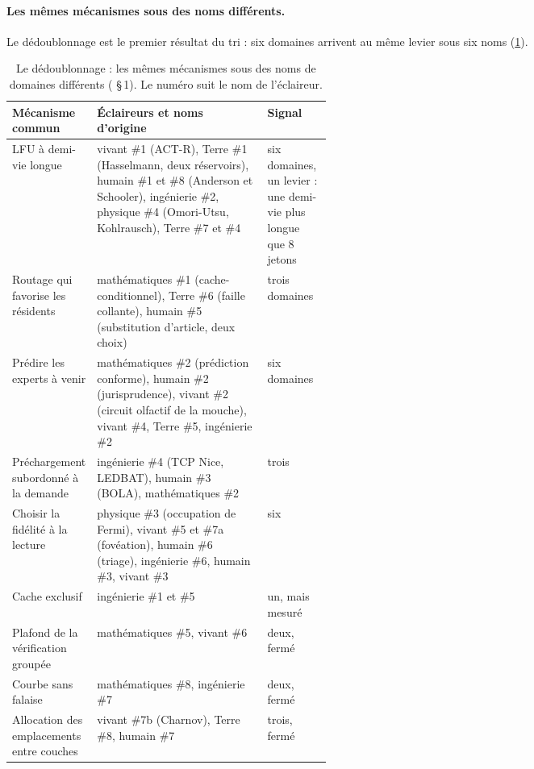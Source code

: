 \paragraph{Les mêmes mécanismes sous des noms différents.} Le dédoublonnage est le premier résultat du tri : six domaines arrivent au même levier sous six noms (\cref{t3mim:tab:doublons}).

\begin{table}[tbp]
\centering\small
\caption[Le dédoublonnage des candidats]{Le dédoublonnage : les mêmes mécanismes sous des noms de domaines différents ( §\,1). Le numéro suit le nom de l'éclaireur.}
\label{t3mim:tab:doublons}
\renewcommand{\arraystretch}{1.12}
\begin{tabularx}{\linewidth}{@{}>{\raggedright\arraybackslash}p{0.26\linewidth}>{\raggedright\arraybackslash}X>{\raggedright\arraybackslash}p{0.2\linewidth}@{}}
\toprule
Mécanisme commun & Éclaireurs et noms d'origine & Signal \\
\midrule
LFU à demi-vie longue & vivant \#1 (ACT-R), Terre \#1 (Hasselmann, deux réservoirs), humain \#1 et \#8 (Anderson et Schooler), ingénierie \#2, physique \#4 (Omori-Utsu, Kohlrausch), Terre \#7 et \#4 & six domaines, un levier : une demi-vie plus longue que 8 jetons \\
Routage qui favorise les résidents & mathématiques \#1 (cache-conditionnel), Terre \#6 (faille collante), humain \#5 (substitution d'article, deux choix) & trois domaines \\
Prédire les experts à venir & mathématiques \#2 (prédiction conforme), humain \#2 (jurisprudence), vivant \#2 (circuit olfactif de la mouche), vivant \#4, Terre \#5, ingénierie \#2 & six domaines \\
Préchargement subordonné à la demande & ingénierie \#4 (TCP Nice, LEDBAT), humain \#3 (BOLA), mathématiques \#2 & trois \\
Choisir la fidélité à la lecture & physique \#3 (occupation de Fermi), vivant \#5 et \#7a (fovéation), humain \#6 (triage), ingénierie \#6, humain \#3, vivant \#3 & six \\
Cache exclusif & ingénierie \#1 et \#5 & un, mais mesuré \\
Plafond de la vérification groupée & mathématiques \#5, vivant \#6 & deux, fermé \\
Courbe sans falaise & mathématiques \#8, ingénierie \#7 & deux, fermé \\
Allocation des emplacements entre couches & vivant \#7b (Charnov), Terre \#8, humain \#7 & trois, fermé \\
\bottomrule
\end{tabularx}
\end{table}

